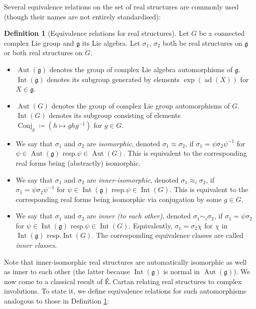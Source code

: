 \documentclass{amsart}
\newcommand{\ad}{\operatorname{ad}}
\newcommand{\Aut}{\operatorname{Aut}}
\newcommand{\Conj}{\operatorname{Conj}}
\newcommand{\g}{\mathfrak{g}}
\newcommand{\Int}{\operatorname{Int}}
\newcommand{\inv}{^{-1}}
\theoremstyle{definition}
\newtheorem{defn}{Definition}[section]
\theoremstyle{plain}
\theoremstyle{remark}
\begin{document}
Several equivalence relations on the set of real structures are commonly used (though their names are not entirely standardised):
\begin{defn}[Equivalence relations for real structures]
\label{def:real_str_equiv_classes}
    Let $G$ be a connected complex Lie group and $\g$ its Lie algebra. Let $\sigma_1$, $\sigma_2$ both be real structures on $\g$ or both real structures on $G$.
    \begin{itemize}
        \item[(i)] $\Aut(\g)$ denotes the group of complex Lie algebra automorphisms of $\g$. $\Int(\g)$ denotes its subgroup generated by elements $\exp(\ad(X))$ for $X\in \g$.
        \item[(ii)] $\Aut(G)$ denotes the group of complex Lie group automorphisms of $G$. $\Int(G)$ denotes its subgroup consisting of elements $\Conj_g\coloneqq (h\mapsto ghg\inv)$ for $g\in G$.
        \item[(iii)] We say that $\sigma_1$ and $\sigma_2$ are \emph{isomorphic}, denoted $\sigma_1\approx \sigma_2$, if $\sigma_1 = \psi \sigma_2 \psi\inv$ for $\psi \in \Aut(\g)$ resp.\;$\psi \in \Aut(G)$. This is equivalent to the corresponding real forms being (abstractly) isomorphic.
        \item[(iv)] We say that $\sigma_1$ and $\sigma_2$ are \emph{inner-isomorphic}, denoted $\sigma_1\approx_i \sigma_2$, if $\sigma_1 = \psi \sigma_2 \psi\inv$ for $\psi \in \Int(\g)$ resp.\;$\psi \in \Int(G)$. This is equivalent to the corresponding real forms being isomorphic via conjugation by some $g\in G$.
        \item[(v)] We say that $\sigma_1$ and $\sigma_2$ are \emph{inner (to each other)}, denoted $\sigma_1 \sim_i \sigma_2$, if $\sigma_1 = \psi \sigma_2$ for $\psi \in \Int(\g)$ resp.\;$\psi \in \Int(G)$. Equivalently, $\sigma_1 = \sigma_2 \chi$ for $\chi$ in $\Int(\g)$ resp.\;$\Int(G)$. The corresponding equivalence classes are called \emph{inner classes}.
    \end{itemize}
\end{defn}
Note that inner-isomorphic real structures are automatically isomorphic as well as inner to each other (the latter because $\Int(\g)$ is normal in $\Aut(\g)$). We now come to a classical result of É.\,Cartan \cite{Cartan1914} relating real structures to complex involutions. To state it, we define equivalence relations for such automorphisms analogous to those in Definition \ref{def:real_str_equiv_classes}:
\end{document}
